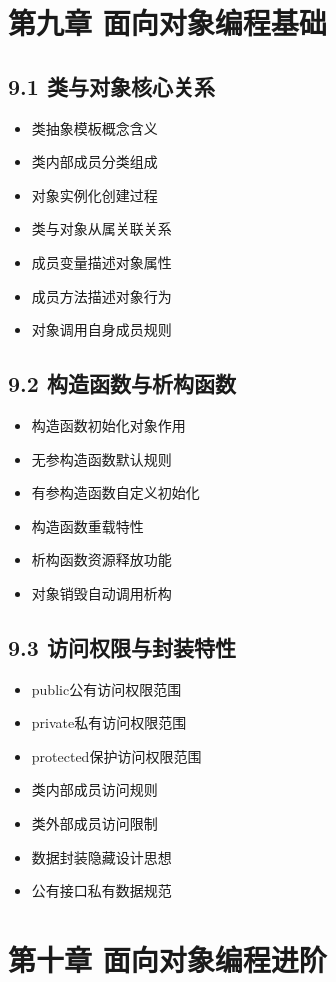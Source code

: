 \section{第九章 面向对象编程基础}
\subsection{9.1 类与对象核心关系}
\begin{itemize}
\item 类抽象模板概念含义
\item 类内部成员分类组成
\item 对象实例化创建过程
\item 类与对象从属关联关系
\item 成员变量描述对象属性
\item 成员方法描述对象行为
\item 对象调用自身成员规则
\end{itemize}

\subsection{9.2 构造函数与析构函数}
\begin{itemize}
\item 构造函数初始化对象作用
\item 无参构造函数默认规则
\item 有参构造函数自定义初始化
\item 构造函数重载特性
\item 析构函数资源释放功能
\item 对象销毁自动调用析构
\end{itemize}

\subsection{9.3 访问权限与封装特性}
\begin{itemize}
\item public公有访问权限范围
\item private私有访问权限范围
\item protected保护访问权限范围
\item 类内部成员访问规则
\item 类外部成员访问限制
\item 数据封装隐藏设计思想
\item 公有接口私有数据规范
\end{itemize}

\section{第十章 面向对象编程进阶}
